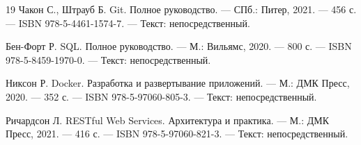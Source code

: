 \begin{thebibliography}{19}
     Чакон С., Штрауб Б. Git. Полное руководство. — СПб.: Питер, 2021. — 456 с. — ISBN 978-5-4461-1574-7. — Текст: непосредственный.

     Бен-Форт Р. SQL. Полное руководство. — М.: Вильямс, 2020. — 800 с. — ISBN 978-5-8459-1970-0. — Текст: непосредственный.

     Никсон Р. Docker. Разработка и развертывание приложений. — М.: ДМК Пресс, 2020. — 352 с. — ISBN 978-5-97060-805-3. — Текст: непосредственный.

     Ричардсон Л. RESTful Web Services. Архитектура и практика. — М.: ДМК Пресс, 2021. — 416 с. — ISBN 978-5-97060-821-3. — Текст: непосредственный.

\end{thebibliography}

